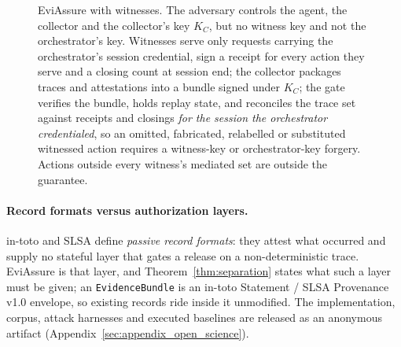 \documentclass[letterpaper,10pt,twocolumn]{article}
\theoremstyle{definition}
\begin{document}
\begin{figure}[t]
\caption{EviAssure with witnesses. The adversary controls the agent, the collector and the collector's key $K_C$, but no witness key and not the orchestrator's key. Witnesses serve only requests carrying the orchestrator's session credential, sign a receipt for every action they serve and a closing count at session end; the collector packages traces and attestations into a bundle signed under $K_C$; the gate verifies the bundle, holds replay state, and reconciles the trace set against receipts and closings \emph{for the session the orchestrator credentialed}, so an omitted, fabricated, relabelled or substituted witnessed action requires a witness-key or orchestrator-key forgery. Actions outside every witness's mediated set are outside the guarantee.}
\label{fig:architecture}
\end{figure}

\paragraph{Record formats versus authorization layers.}
in-toto and SLSA define \emph{passive record formats}: they attest what occurred and supply no stateful layer that gates a release on a non-deterministic trace. EviAssure is that layer, and Theorem~\ref{thm:separation} states what such a layer must be given; an \texttt{EvidenceBundle} is an in-toto Statement / SLSA Provenance v1.0 envelope, so existing records ride inside it unmodified. The implementation, corpus, attack harnesses and executed baselines are released as an anonymous artifact (Appendix~\ref{sec:appendix_open_science}).
\end{document}
